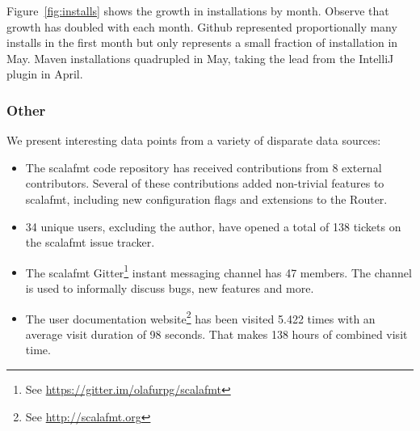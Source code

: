 Figure~\ref{fig:installs} shows the growth in installations by month.
Observe that growth has doubled with each month.
Github represented proportionally many installs in the first month but only represents a small fraction of installation in May.
Maven installations quadrupled in May, taking the lead from the IntelliJ plugin in April.


\subsubsection{Other}
We present interesting data points from a variety of disparate data sources:

\begin{itemize}
  \item The scalafmt code repository has received contributions from 8 external contributors.
    Several of these contributions added non-trivial features to scalafmt, including
    new configuration flags and extensions to the Router.
  \item 34 unique users, excluding the author, have opened a total of 138 tickets on the scalafmt issue tracker.
  \item The scalafmt Gitter\footnote{See \url{https://gitter.im/olafurpg/scalafmt}} instant messaging channel has 47 members. The channel is used to informally discuss bugs, new features and more.
  \item The user documentation website\footnote{See \url{http://scalafmt.org}} has been visited 5.422 times with an average visit duration of 98 seconds. That makes 138 hours of combined visit time.
\end{itemize}



